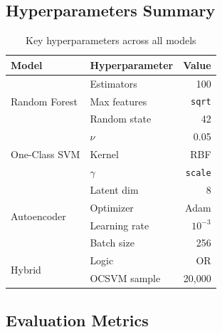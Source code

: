 \documentclass[10pt,conference]{IEEEtran}
\begin{document}
\subsection{Hyperparameters Summary}

\begin{table}[htbp]
\centering
\caption{Key hyperparameters across all models}
\label{tab:hyperparams}
\begin{tabular}{llr}
\toprule
\textbf{Model} & \textbf{Hyperparameter} & \textbf{Value} \\
\midrule
\multirow{3}{*}{Random Forest}
  & Estimators      & 100 \\
  & Max features    & \texttt{sqrt} \\
  & Random state    & 42 \\
\midrule
\multirow{3}{*}{One-Class SVM}
  & $\nu$           & 0.05 \\
  & Kernel          & RBF \\
  & $\gamma$        & \texttt{scale} \\
\midrule
\multirow{4}{*}{Autoencoder}
  & Latent dim      & 8 \\
  & Optimizer       & Adam \\
  & Learning rate   & $10^{-3}$ \\
  & Batch size      & 256 \\
\midrule
\multirow{2}{*}{Hybrid}
  & Logic           & OR \\
  & OCSVM sample    & 20{,}000 \\
\bottomrule
\end{tabular}
\end{table}

\subsection{Evaluation Metrics}
\end{document}
